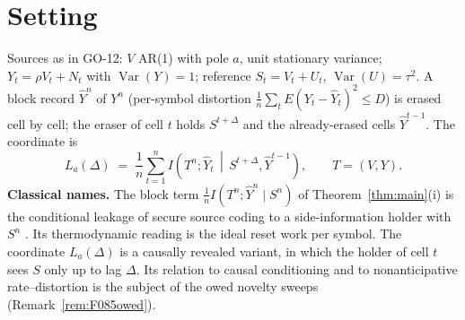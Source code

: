 \documentclass[11pt]{article}
\theoremstyle{definition}
\theoremstyle{remark}
\begin{document}
\begin{abstract}
squared distance to a \emph{closed} span, finite combinations are dense by
definition, the infimum is \emph{not attained} by any finite filter, and the
hypotheses are $\Phi_R,f_S\in L^1$ and nothing else. Theorem~\ref{thm:D}
truncates an \emph{arbitrary near-optimal feasible record} --- never the fixed
point, so the circularity is gone --- by Fej\'er means, whose non-negativity
makes the truncated noise a genuine MA($L$) by Fej\'er--Riesz; its hypotheses
are printed in full, and the spectral cap is \emph{deleted from the proof} as
dispensable, feasibility alone giving $\|g\|_2\le2.343168$ and
$\|a_y\|_2\le1.766965$ because $f_V\in[0.1111,9.0000]$. Lemma~\ref{lem:M} is
restated as an \emph{exact} three-leg decomposition with
$\eta_n=2L(1+\varepsilon-D)/(n-2L)$, and \textbf{two of its headline claims
are withdrawn}: the constants are \emph{not} $n$-independent (measured
$72.444\to12.676$ over $n=64\ldots1024$ at $L=6$ --- the same factor-$5.7$
decrease W1 refuted, in the very build Lemma~M was written to fix), and there
\emph{is} a feasibility threshold (at $L=10$, $n=64$ the shifted target is
$-0.01864<0$, the same threshold W2 recorded). \textbf{Lemma~M therefore does
not discharge W1 or W4; W1 and W2 stand} --- and, since only $C(L,n)=o(n)$ is
ever used downstream, the conclusion is untouched. Consequently
\[
L^\infty(\Delta)\;=\;\Psi(D;\Delta),\qquad \Delta=0,1,2,
\]
\textbf{as a \emph{scoped} theorem} (Theorem~\ref{thm:equality}), in the
permitted wording of \S\ref{sec:scopedequality} and only there, carrying five
further named scope items beyond those of Corollary~\ref{cor:onedir}.
\textbf{The word ``unconditional'' does not attach to this equality}; $\Psi$
remains a two-sided \emph{certified bracket}; the equality identifies two
objects and is \emph{not} a licence to quote a value as exact; and
Corollary~\ref{cor:brackets} continues to govern the quotable numeric
statement.
\end{abstract}

\section{Setting}
Sources as in GO-12: $V$ AR(1) with pole $a$, unit stationary
variance; $Y_t=\rho V_t+N_t$ with $\operatorname{Var}(Y)=1$;
reference $S_t=V_t+U_t$, $\operatorname{Var}(U)=\tau^2$. A block
record $\hat Y^n$ of $Y^n$ (per-symbol distortion
$\tfrac1n\sum_tE(Y_t-\hat Y_t)^2\le D$) is erased cell by cell; the
eraser of cell $t$ holds $S^{t+\Delta}$ and the already-erased cells
$\hat Y^{t-1}$. The coordinate is
\[
L_a(\Delta)\;=\;\frac1n\sum_{t=1}^{n}
I\!\left(T^n;\hat Y_t\,\middle|\,S^{t+\Delta},\hat Y^{t-1}\right),
\qquad T=(V,Y).
\]
\noindent\textbf{Classical names.} The block term
$\tfrac1nI(T^n;\hat Y^n\mid S^n)$ of Theorem~\ref{thm:main}(i) is the
conditional leakage of secure source coding to a side-information holder
with $S^n$ \cite{bib:villard2013,bib:ekrem2013}. Its thermodynamic reading is
the ideal reset work per symbol. The coordinate $L_a(\Delta)$ is a causally
revealed variant, in which the holder of cell $t$ sees $S$ only up to lag
$\Delta$. Its relation to causal conditioning and to nonanticipative
rate--distortion is the subject of the owed novelty sweeps
(Remark~\ref{rem:F085owed}).
\end{document}
